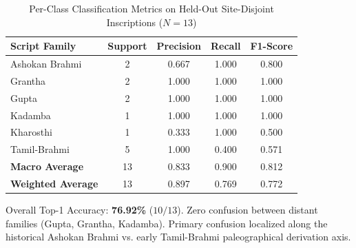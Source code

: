 \begin{table}[t]
\centering
\caption{Per-Class Classification Metrics on Held-Out Site-Disjoint Inscriptions ($N = 13$)}
\label{tab:per_class_results}
\small
\begin{tabular}{l c c c c}
\toprule
\textbf{Script Family} & \textbf{Support} & \textbf{Precision} & \textbf{Recall} & \textbf{F1-Score} \\
\midrule
Ashokan Brahmi & 2 & 0.667 & 1.000 & 0.800 \\
Grantha        & 2 & 1.000 & 1.000 & 1.000 \\
Gupta          & 2 & 1.000 & 1.000 & 1.000 \\
Kadamba        & 1 & 1.000 & 1.000 & 1.000 \\
Kharosthi      & 1 & 0.333 & 1.000 & 0.500 \\
Tamil-Brahmi   & 5 & 1.000 & 0.400 & 0.571 \\
\midrule
\textbf{Macro Average}    & 13 & 0.833 & 0.900 & 0.812 \\
\textbf{Weighted Average} & 13 & 0.897 & 0.769 & 0.772 \\
\bottomrule
\end{tabular}
\vspace{1mm}
\begin{minipage}{\linewidth}
\footnotesize Overall Top-1 Accuracy: \textbf{76.92\%} ($10/13$). Zero confusion between distant families (Gupta, Grantha, Kadamba). Primary confusion localized along the historical Ashokan Brahmi vs. early Tamil-Brahmi paleographical derivation axis.
\end{minipage}
\end{table}
